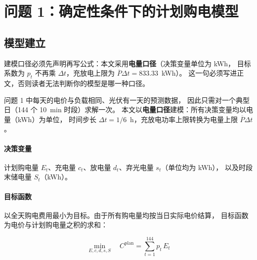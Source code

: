 
\section{问题 1：确定性条件下的计划购电模型}

\subsection{模型建立}

\begin{guideblock}
建模口径必须先声明再写公式：本文采用\textbf{电量口径}（决策变量单位为 kWh，
目标系数为 \(p_t\) 不再乘 \(\Delta t\)，充放电上限为 \(\overline P\Delta t=833.33\)~kWh）。
这一句必须写进正文，否则读者无法判断你的模型是哪一种口径。
\end{guideblock}

问题 1 中每天的电价与负载相同、光伏有一天的预测数据，
因此只需对一个典型日（144 个 10~min 时段）求解一次。
本文以\textbf{电量口径}建模：所有决策变量均以电量（kWh）为单位，
时间步长 \(\Delta t=1/6\)~h，充放电功率上限转换为电量上限 \(\overline P\Delta t\)。

\paragraph{决策变量}
计划购电量 \(E_t\)、充电量 \(c_t\)、放电量 \(d_t\)、弃光电量 \(s_t\)（单位均为 kWh），
以及时段末储电量 \(S_t\)（kWh）。

\paragraph{目标函数}
以全天购电费用最小为目标。由于所有购电量均按当日实际电价结算，
目标函数为电价与计划购电量之积的求和：

\begin{equation}
  \min_{E,c,d,s,S}\quad C^{\text{plan}}=\sum_{t=1}^{144} p_t\,E_t
  \label{eq:q1-obj}
\end{equation}

